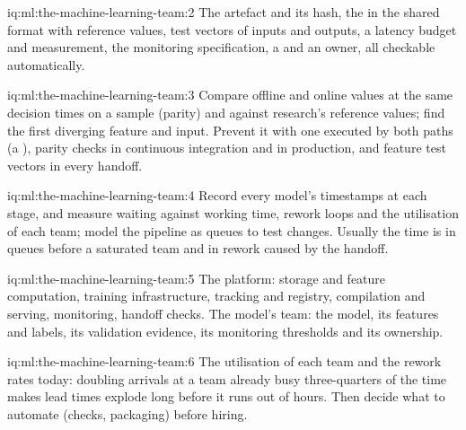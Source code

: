 \begin{solution}{iq:ml:the-machine-learning-team:2}
The artefact and its hash, the  in the shared format with reference values, test vectors of inputs and
outputs, a latency budget and measurement, the monitoring specification, a  and an owner, all checkable automatically.
\end{solution}

\begin{solution}{iq:ml:the-machine-learning-team:3}
Compare offline and online values at the same decision times on a sample (parity) and against research's reference values;
find the first diverging feature and input. Prevent it with one  executed by both paths (a ),
parity checks in continuous integration and in production, and feature test vectors in every handoff.
\end{solution}

\begin{solution}{iq:ml:the-machine-learning-team:4}
Record every model's timestamps at each stage, and measure waiting against working time, rework loops and the utilisation of each
team; model the pipeline as queues to test changes. Usually the time is in queues before a saturated team and in rework caused by
the handoff.
\end{solution}

\begin{solution}{iq:ml:the-machine-learning-team:5}
The platform: storage and feature computation, training infrastructure, tracking and registry, compilation and serving,
monitoring, handoff checks. The model's team: the model, its features and labels, its validation evidence, its monitoring
thresholds and its ownership.
\end{solution}

\begin{solution}{iq:ml:the-machine-learning-team:6}
The utilisation of each team and the rework rates today: doubling arrivals at a team already busy three-quarters of the time
makes lead times explode long before it runs out of hours. Then decide what to automate (checks, packaging) before hiring.
\end{solution}
